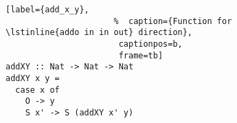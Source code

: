 \begin{figure}[!t]
  \centering
  \begin{minipage}{\columnwidth}
    \begin{lstlisting}[label={add_x_y},
                      %  caption={Function for \lstinline{addo in in out} direction},
                       captionpos=b,
                       frame=tb]
addXY :: Nat -> Nat -> Nat
addXY x y =
  case x of
    O -> y
    S x' -> S (addXY x' y)
    \end{lstlisting}
  \end{minipage}
\end{figure}

